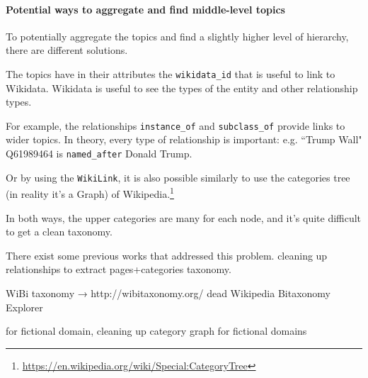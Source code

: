 



\paragraph{\statusred Potential ways to aggregate and find middle-level topics}

To potentially aggregate the topics and find a slightly higher level of hierarchy, there are different solutions.

The topics have in their attributes the \texttt{wikidata\_id} that is useful to link to Wikidata. Wikidata is useful to see the types of the entity and other relationship types.

For example, the relationships \texttt{instance\_of} and \texttt{subclass\_of} provide links to wider topics. In theory, every type of relationship is important: e.g. ``Trump Wall" Q61989464 is \texttt{named\_after} Donald Trump.

Or by using the \texttt{WikiLink}, it is also possible similarly to use the categories tree (in reality it’s a Graph) of Wikipedia.\footnote{ \href{https://en.wikipedia.org/wiki/Special:CategoryTree?target=Category\%3APolitics&mode=all&namespaces=&title=Special\%3ACategoryTree}{https://en.wikipedia.org/wiki/Special:CategoryTree}}

In both ways, the upper categories are many for each node, and it’s quite difficult to get a clean taxonomy.

There exist some previous works that addressed this problem.
cleaning up relationships to extract pages+categories taxonomy.

WiBi taxonomy → http://wibitaxonomy.org/ dead Wikipedia Bitaxonomy Explorer
\cite{flati2014wikipedia,flati2014two,ponzetto2009large}

\cite{chu2019tifi} for fictional domain, cleaning up category graph for fictional domains





